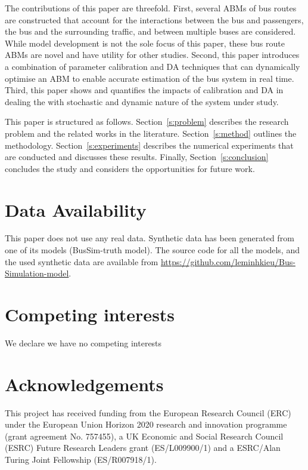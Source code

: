 \documentclass{article}
\begin{document}
The contributions of this paper are threefold. First, several ABMs of bus routes are constructed that account for the interactions between the bus and passengers, the bus and the surrounding traffic, and between multiple buses are considered. While model development is not the sole focus of this paper, these bus route ABMs are novel and have utility for other studies. Second, this paper introduces a combination of parameter calibration and DA techniques that can dynamically optimise an ABM to enable accurate estimation of the bus system in real time. Third, this paper shows and quantifies the impacts of calibration and DA in dealing the with stochastic and dynamic nature of the system under study.

This paper is structured as follows. Section~\ref{s:problem} describes
the research problem and the related works in the literature.
Section~\ref{s:method} outlines the methodology. Section~\ref{s:experiments} describes
the numerical experiments that are conducted and discusses these
results. Finally, Section~\ref{s:conclusion} concludes the study and
considers the opportunities for future work. 












\section*{Data Availability} This paper does not use any real data. Synthetic data has been generated from one of its models (BusSim-truth model). The source code for all the models, and the used synthetic data are available from \url{https://github.com/leminhkieu/Bus-Simulation-model}. 

\section*{Competing interests} We declare we have no competing interests

\section*{Acknowledgements} This project has received funding from the
European Research Council (ERC) under the European Union Horizon 2020 research and innovation programme (grant agreement No. 757455), a UK Economic and Social Research Council (ESRC) Future Research Leaders grant (ES/L009900/1) and a ESRC/Alan Turing Joint Fellowship
(ES/R007918/1).

\appendix 
\appendix 

 

\end{document}
